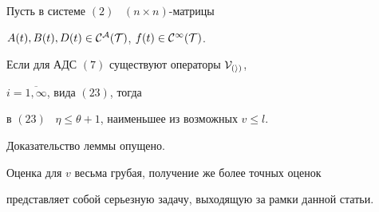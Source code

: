 \begin{lem}


Пусть в системе $(2)$ \ $(n \times n)$-матрицы


$A(t),B(t),D(t) \in \cal C^A(T)$, $f(t) \in \cal C^{\infty}(T)$.


Если для АДС $(7)$ существуют операторы $\cal V_{(i)}$,


$i=\overline{1,\infty}$, вида $(23)$, тогда


в $(23)$ \ $\eta \le \theta +1$, наименьшее из возможных $v \le l$.


\end{lem}





Доказательство леммы опущено.


Оценка для $v$ весьма грубая, получение же более точных оценок


представляет собой серьезную задачу, выходящую за рамки данной статьи.





